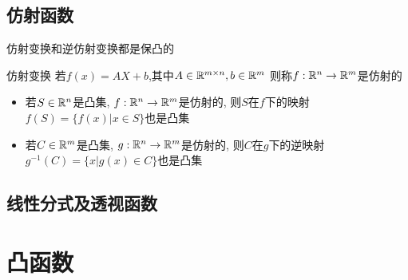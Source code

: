 \documentclass{mytemplate}
\begin{document}
\subsection{仿射函数}
仿射变换和逆仿射变换都是保凸的
\begin{definition}{仿射变换}
    若$f(x)=AX+b$,其中$A \in \mathbb{R}^{m \times n}, b\in \mathbb{R}^m$
    则称$f: \mathbb{R}^n \rightarrow \mathbb{R}^m$是仿射的
\end{definition}
\begin{itemize}
    \item 若$S \in \mathbb{R}^n$是凸集, $f: \mathbb{R}^n \rightarrow \mathbb{R}^m$是仿射的, 则$S$在$f$下的映射\\$f(S)=\{f(x)|x \in S\}$也是凸集
    \item 若$C \in \mathbb{R}^m$是凸集, $g: \mathbb{R}^n \rightarrow \mathbb{R}^m$是仿射的, 则$C$在$g$下的逆映射\\$g^{-1}(C)=\{x|g(x) \in C\}$也是凸集
\end{itemize}


\subsection{线性分式及透视函数}


\section{凸函数}
\end{document}

